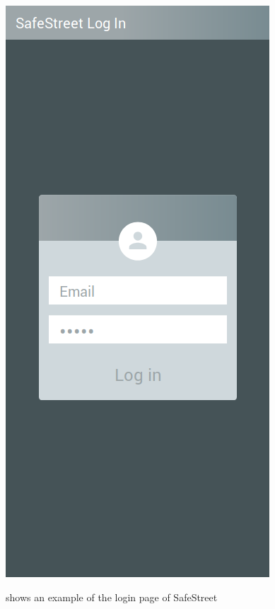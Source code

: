 \documentclass[../RASD.tex]{subfiles}
\begin{document}
            \begin{figure}[H]
                \centering
                \includegraphics[scale = 0.4]{assets/login.png}\\[1.6 cm]
                \caption[\textit{User} Login \textit{Mockup}]{shows an example of the login page of SafeStreet}
            \end{figure}
\end{document}

